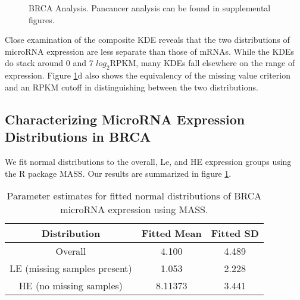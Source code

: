 \documentclass[12pt]{report}
\begin{document}
\begin{figure}[H]
\centering
{}
  \caption{BRCA Analysis. Pancancer analysis can be found in supplemental figures.}
 \label{fig::brca_mirna_kde}
\end{figure}


Close examination of the composite KDE reveals that the two distributions of microRNA expression are less separate than those of mRNAs. While the KDEs do stack around 0 and 7 $log_{2} \text{RPKM}$, many KDEs fall
elsewhere on the range of expression. Figure \ref{fig::brca_mirna_kde}d also shows the equivalency of the missing value criterion and an RPKM cutoff in distinguishing between the two distributions.

\subsection*{Characterizing MicroRNA Expression Distributions in BRCA}
  We fit normal distributions to the overall, Le, and HE expression groups using the R package MASS. Our results are summarized in figure \ref{fig::fitted_tabular}.
  
  \begin{table}[H]
  \centering
   \caption{Parameter estimates for fitted normal distributions of BRCA microRNA expression using MASS.}
   \begin{tabular}[]{| c | c | c |}
   \hline
    Distribution & Fitted Mean & Fitted SD\\
    \hline 
    Overall& 4.100 & 4.489\\
    \hline
    LE (missing samples present)& 1.053 & 2.228\\
    \hline
    HE (no missing samples) & 8.11373 & 3.441\\
    \hline
   \end{tabular}
  
   \label{fig::fitted_tabular}
  \end{table}
\end{document}
